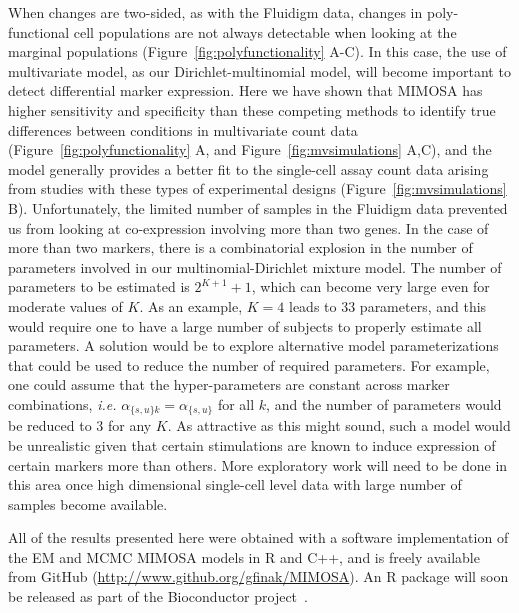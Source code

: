\documentclass[useAMS,referee,usenatbib]{biom}
\begin{document}
When changes are two-sided, as with the Fluidigm data, changes in poly-functional cell populations are not always detectable when looking at the marginal populations (Figure~\ref{fig:polyfunctionality} A-C). 
In this case, the use of multivariate model, as our Dirichlet-multinomial model, will become important to detect differential marker expression. 
Here we have shown that MIMOSA has higher sensitivity and specificity than these competing methods to identify true differences between conditions in multivariate count data (Figure~\ref{fig:polyfunctionality} A, and Figure~\ref{fig:mvsimulations} A,C), and the model generally provides a better fit to the single-cell assay count data arising from studies with these types of experimental designs (Figure~\ref{fig:mvsimulations} B). 
Unfortunately, the limited number of samples in the Fluidigm data prevented us from looking at co-expression involving more than two genes. 
In the case of more than two markers, there is a combinatorial explosion in the number of parameters involved in our multinomial-Dirichlet mixture model. The number of parameters to be estimated is $2^{K+1}+1$, which can become very large even for moderate values of $K$. As an example, $K=4$ leads to 33 parameters, and this would require one to have a large number of subjects to properly estimate all parameters. 
A solution would be to explore alternative model parameterizations that could be used to reduce the number of required parameters. 
For example, one could assume that the hyper-parameters are constant across marker combinations, \textit{i.e.} $\alpha_{\{s,u\}k}=\alpha_{\{s,u\}}$ for all $k$, and the number of parameters would be reduced to $3$ for any $K$. 
As attractive as this might sound, such a model would be unrealistic given that certain stimulations are known to induce expression of certain markers more than others. 
More exploratory work will need to be done in this area once high dimensional single-cell level data with large number of samples become available.

All of the results presented here were obtained with a software implementation of the EM and MCMC MIMOSA models in R and C++, and is freely available from GitHub (\url{http://www.github.org/gfinak/MIMOSA}). An R package will soon be released as part of the Bioconductor project~\citep{Gentleman:2004tt}. 
\end{document}
